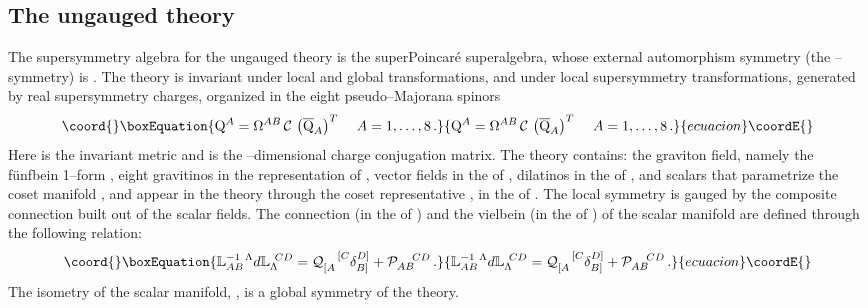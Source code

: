 \documentclass[a4paper,12pt]{article}
\begin{document}
\subsection{The ungauged theory}
The supersymmetry algebra for the ungauged theory is the
superPoincar\'e superalgebra, whose external automorphism
symmetry (the \coordHE{}--symmetry) is \coordHE{}. The
theory is invariant under local \coordHE{} and
global \coordHE{} transformations,
and under local supersymmetry transformations, generated by \coordHE{} real
supersymmetry charges, organized in the eight pseudo--Majorana spinors
\begin{equation}\coord{}\boxEquation{
\mathrm{Q}^A=\Omega^{AB} \, \mathcal{C} \, \left( \overline{\mathrm{Q}}_A\right) ^T \,
 ~~~A=1,\dots,8\,.
}{
\mathrm{Q}^A=\Omega^{AB} \, \mathcal{C} \, \left( \overline{\mathrm{Q}}_A\right) ^T \,
 ~~~A=1,\dots,8\,.
}{ecuacion}\coordE{}\end{equation}
Here \coordHE{} is the \coordHE{} invariant
metric and \coordHE{} is the \coordHE{}--dimensional charge conjugation matrix.
The theory contains: the graviton field, namely the f\"unfbein 1--form \coordHE{},
eight gravitinos \coordHE{} in the
\coordHE{} representation of \coordHE{}, \coordHE{} vector fields
 \coordHE{} in the \coordHE{} of
 \coordHE{},
\coordHE{} dilatinos \coordHE{} in the \coordHE{} of \coordHE{}, and \coordHE{} scalars
\myHighlight{$\phi$}\coordHE{} that
parametrize the coset manifold \coordHE{}, and
appear in the theory through the coset representative \coordHE{}, in the
\coordHE{} of \coordHE{}.
The local \coordHE{} symmetry is gauged by the composite connection
built out of the scalar fields. The connection (in the \coordHE{} of \coordHE{})
and the vielbein (in the \coordHE{} of \coordHE{}) of the
scalar manifold are defined through the following relation:
\begin{equation}\coord{}\boxEquation{
\mathbb{L}^{-1~\Lambda}_{AB}d\mathbb{L}_{\Lambda}^{~CD}=
\mathcal{Q}_{[A}^{~~~[C}\delta^{D]}_{B]}+\mathcal{P}_{AB}^{~~~CD}\,.
\label{defungaugedconnection}
}{
\mathbb{L}^{-1~\Lambda}_{AB}d\mathbb{L}_{\Lambda}^{~CD}=
\mathcal{Q}_{[A}^{~~~[C}\delta^{D]}_{B]}+\mathcal{P}_{AB}^{~~~CD}\,.
}{ecuacion}\coordE{}\end{equation}
The isometry of the scalar manifold, \coordHE{}, is a global symmetry of
the theory.
\end{document}
